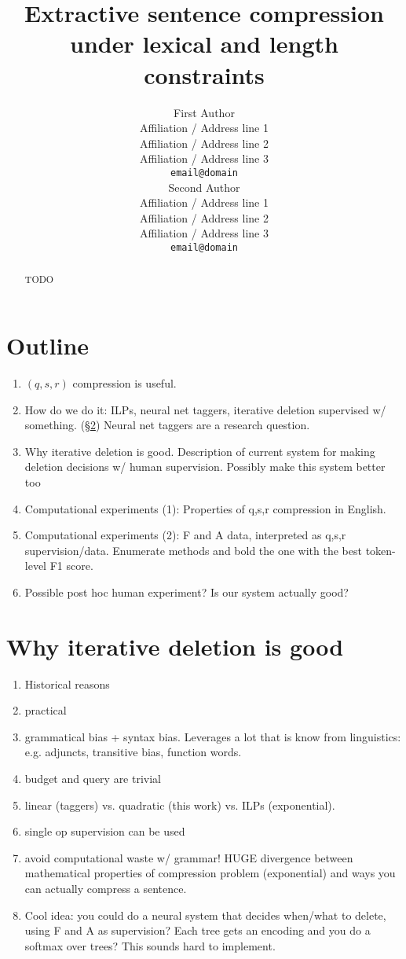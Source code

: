 \documentclass[11pt,a4paper]{article}
\title{Extractive sentence compression under lexical and length constraints}
\author{First Author \\
  Affiliation / Address line 1 \\
  Affiliation / Address line 2 \\
  Affiliation / Address line 3 \\
  {\tt email@domain} \\\And
  Second Author \\
  Affiliation / Address line 1 \\
  Affiliation / Address line 2 \\
  Affiliation / Address line 3 \\
  {\tt email@domain} \\}
\date{}
\begin{document}
\maketitle

\begin{abstract}
TODO
\end{abstract}

\section{Outline}

\begin{enumerate}
\item{$(q,s,r)$ compression is useful.}
\item{How do we do it: ILPs, neural net taggers, iterative deletion supervised w/ something. (\S\ref{s:method}) Neural net taggers are a research question.}
\item{Why iterative deletion is good. Description of current system for making deletion decisions w/ human supervision. Possibly make this system better too}
\item{Computational experiments (1): Properties of q,s,r compression in English. }
\item{Computational experiments (2): F and A data, interpreted as q,s,r supervision/data. Enumerate methods and bold the one with the best token-level F1 score.}
\item{Possible post hoc human experiment? Is our system actually good?}
\end{enumerate}




\section{Why iterative deletion is good}\label{s:method}
\begin{enumerate}
\item{Historical reasons}
\item{practical}
\item{grammatical bias + syntax bias. Leverages a lot that is know from linguistics: e.g. adjuncts, transitive bias, function words.}
\item{budget and query are trivial}
\item{linear (taggers) vs. quadratic (this work) vs. ILPs (exponential). }
\item{single op supervision can be used}
\item{avoid computational waste w/ grammar! HUGE divergence between mathematical properties of compression problem (exponential) and ways you can actually compress a sentence.}
\item{Cool idea: you could do a neural system that decides when/what to delete, using F and A as supervision? Each tree gets an encoding and you do a softmax over trees? This sounds hard to implement.}
\end{enumerate}
\end{document}
